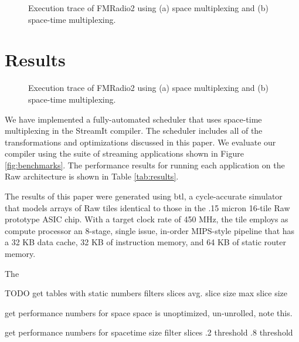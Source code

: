 \begin{figure}[t]
\centering
{}
\vspace{-6pt}
\caption{Execution trace of FMRadio2 using (a) space multiplexing and (b) space-time multiplexing.
\protect\label{fig:bloodgraph}}
\end{figure}

\section{Results}
\label{sec:results}

\begin{figure*}[t]
\centering
{}
\vspace{-6pt}
\caption{Execution trace of FMRadio2 using (a) space multiplexing and (b) space-time multiplexing.
\protect\label{fig:bloodgraph}}
\end{figure*}

We have implemented a fully-automated scheduler that uses space-time
multiplexing in the StreamIt compiler.  The scheduler includes all of
the transformations and optimizations discussed in this paper.  We
evaluate our compiler using the suite of streaming applications shown
in Figure \ref{fig:benchmarks}.  The performance results for running
each application on the Raw architecture is shown in Table
\ref{tab:results}.

The results of this paper were generated using btl, a cycle-accurate
simulator that models arrays of Raw tiles identical to those in the
.15 micron 16-tile Raw prototype ASIC chip.  With a target clock rate
of 450 MHz, the tile employs as compute processor an 8-stage, single
issue, in-order MIPS-style pipeline that has a 32 KB data cache, 32 KB
of instruction memory, and 64 KB of static router memory.



The 

TODO
get tables with static numbers
	filters
	slices
	avg. slice size
	max slice size

get performance numbers for space
	space is unoptimized, un-unrolled, note this.

get performance numbers for spacetime 
	size filter slices
	.2 threshold
	.8 threshold
